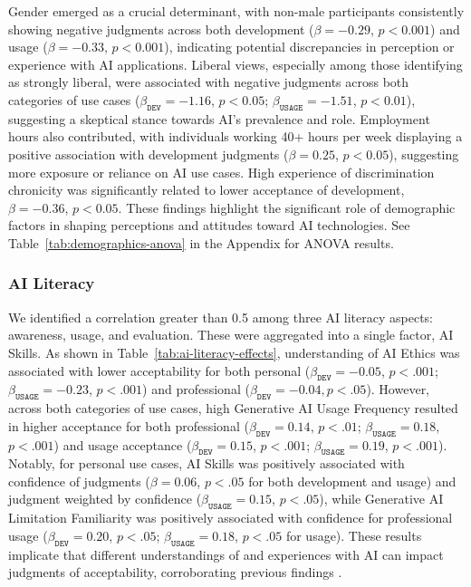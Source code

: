 Gender emerged as a crucial determinant, with non-male participants consistently showing negative judgments across both development ($\beta = -0.29$, $p<0.001$) and usage ($\beta = -0.33$, $p<0.001$), indicating potential discrepancies in perception or experience with AI applications. Liberal views, especially among those identifying as strongly liberal, were associated with negative judgments across both categories of use cases ($\beta_{\texttt{DEV}} = -1.16$, $p<0.05$; $\beta_{\texttt{USAGE}} = -1.51$, $p<0.01$), suggesting a skeptical stance towards AI's prevalence and role. Employment hours also contributed, with individuals working 40+ hours per week displaying a positive association with development judgments ($\beta = 0.25$, $p<0.05$), suggesting more exposure or reliance on AI use cases. High experience of discrimination chronicity was significantly related to lower acceptance of development, $\beta = -0.36$, $p<0.05$. These findings highlight the significant role of demographic factors in shaping perceptions and attitudes toward AI technologies. See Table~\ref{tab:demographics-anova} in the Appendix for ANOVA results. 


\subsubsection{AI Literacy}
We identified a correlation greater than 0.5 among three AI literacy aspects: awareness, usage, and evaluation. These were aggregated into a single factor, AI Skills. As shown in Table~\ref{tab:ai-literacy-effects}, understanding of AI Ethics was associated with lower acceptability for both personal ($\beta_{\texttt{DEV}}=-0.05$, $p<.001$; $\beta_{\texttt{USAGE}}=-0.23$, $p<.001$) and professional ($\beta_{\texttt{DEV}} = -0.04,p<.05$). However, across both categories of use cases, high Generative AI Usage Frequency resulted in higher acceptance for both professional ($\beta_{\texttt{DEV}}=0.14$, $p<.01$; $\beta_{\texttt{USAGE}}=0.18$, $p<.001$) and usage acceptance ($\beta_{\texttt{DEV}}=0.15$, $p<.001$; $\beta_{\texttt{USAGE}}=0.19$, $p<.001$). Notably, for personal use cases, AI Skills was positively associated with confidence of judgments ($\beta=0.06$, $p<.05$ for both development and usage) and judgment weighted by confidence ($\beta_{\texttt{USAGE}}=0.15$, $p<.05$), while Generative AI Limitation Familiarity was positively associated with confidence for professional usage ($\beta_{\texttt{DEV}}=0.20$, $p<.05$; $\beta_{\texttt{USAGE}}=0.18$, $p<.05$ for usage). These results implicate that different understandings of and experiences with AI can impact judgments of acceptability, corroborating previous findings \citep{kramer2018when}.

